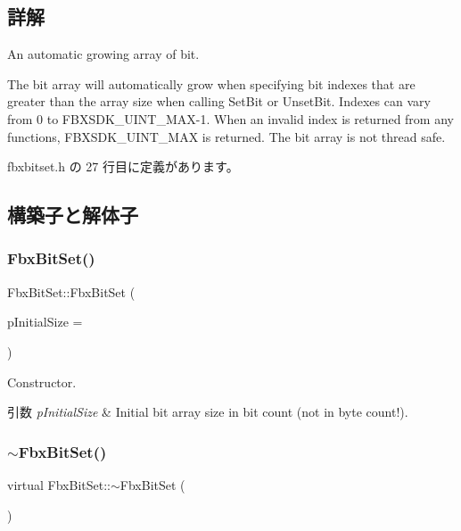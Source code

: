 \subsection{詳解}
An automatic growing array of bit.

The bit array will automatically grow when specifying bit indexes that are greater than the array size when calling Set\+Bit or Unset\+Bit. Indexes can vary from 0 to F\+B\+X\+S\+D\+K\+\_\+\+U\+I\+N\+T\+\_\+\+M\+A\+X-\/1. When an invalid index is returned from any functions, F\+B\+X\+S\+D\+K\+\_\+\+U\+I\+N\+T\+\_\+\+M\+AX is returned. The bit array is not thread safe. 

 fbxbitset.\+h の 27 行目に定義があります。



\subsection{構築子と解体子}
\mbox{\label{class_fbx_bit_set_ad2f5e43f377d1382c847befddb386710}} 
\subsubsection{\texorpdfstring{Fbx\+Bit\+Set()}{FbxBitSet()}}
{\footnotesize\ttfamily Fbx\+Bit\+Set\+::\+Fbx\+Bit\+Set (\begin{DoxyParamCaption}\item[{const \hyperlink{fbxtypes_8h_ae9fb141d8158a730aa85ec5ff2ea3f6b}{Fbx\+U\+Int}}]{p\+Initial\+Size = {} }\end{DoxyParamCaption})}

Constructor. 
\begin{DoxyParams}{引数}
{\em p\+Initial\+Size} & Initial bit array size in bit count (not in byte count!). \\
\hline
\end{DoxyParams}
\mbox{\label{class_fbx_bit_set_af1b946280a865ffe296f72d0a7648c18}} 
\subsubsection{\texorpdfstring{$\sim$\+Fbx\+Bit\+Set()}{~FbxBitSet()}}
{\footnotesize\ttfamily virtual Fbx\+Bit\+Set\+::$\sim$\+Fbx\+Bit\+Set (\begin{DoxyParamCaption}{ }\end{DoxyParamCaption})\hspace{0.3cm}{\ttfamily [virtual]}}



